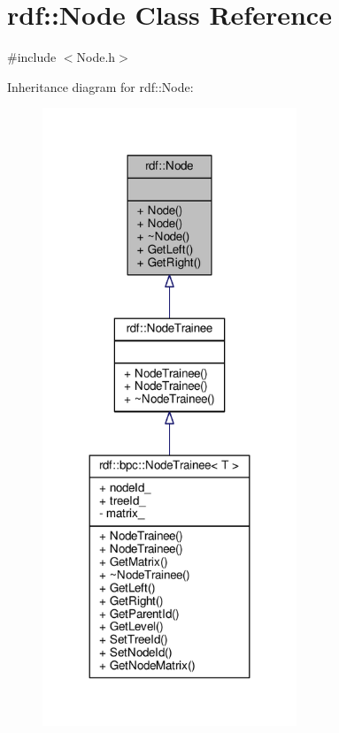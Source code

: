 \hypertarget{classrdf_1_1Node}{}\section{rdf\+:\+:Node Class Reference}
\label{classrdf_1_1Node}


{\ttfamily \#include $<$Node.\+h$>$}



Inheritance diagram for rdf\+:\+:Node\+:
\nopagebreak
\begin{figure}[H]
\begin{center}
\leavevmode
\includegraphics[width=215pt]{classrdf_1_1Node__inherit__graph}
\end{center}
\end{figure}


